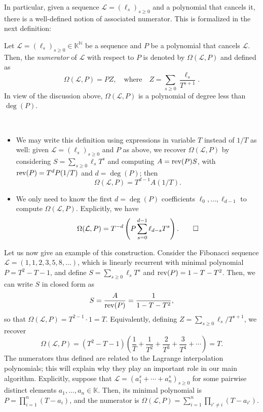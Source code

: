 \documentclass[12pt]{article}
\newcommand{\genseries}{Z}
\newcommand{\minpoly}{P}
\def\N {\ensuremath{\mathbb{N}}}
\def\K{\mathbb{K}}
\def\K {\ensuremath{\mathbb{K}}}
\begin{document}
In particular, given a sequence $\mathcal{L}=(\ell_s)_{s \ge 0}$ and a
polynomial that cancels it, there is a well-defined notion of
associated numerator.  This is formalized in the next definition:
\begin{definition}
  \label{def:omega}
  Let $\mathcal{L}=(\ell_s)_{s \ge 0}\in \K^\N$ be a sequence and $P$ be a
  polynomial that cancels $\mathcal{L}$. Then, the {\em numerator} of $\mathcal{L}$
  with respect to $P$ is denoted by $\Omega(\mathcal{L},P)$ and defined as 
  \[
    \Omega(\mathcal{L},P) = P \genseries, \quad\text{where}\quad
    \genseries=\sum_{s \ge 0} \frac {\ell_s}{T^{s+1}}.
  \]
  In view of the discussion above, $\Omega(\mathcal{L},P)$ is a polynomial of
  degree less than $\deg(P)$.
\end{definition}
\begin{remark} ~
  \begin{itemize}
  \item We may write this definition using expressions in
    variable $T$ instead of $1/T$ as well: given
    $\mathcal{L}=(\ell_s)_{s\ge0}$ and $P$ as above, we recover
    $\Omega(\mathcal{L},P)$ by considering $S=\sum_{s\ge 0} \ell_s
    T^s$ and computing $A = {\rm rev}(P) S$, with ${\rm rev}(P)=T^d
    P(1/T)$ and $d=\deg(P)$; then
    $$\Omega(\mathcal{L} ,P) = T^{d - 1} A (1/T).$$ 
\item We only need to know the first $d=\deg(P)$ coefficients
  $\ell_0,\dots,\ell_{d-1}$ to compute $\Omega(\mathcal{L}, P)$. Explicitly, we
  have
  \[
    \Omega(\mathcal{L},P) = T^{-d} \left( P \sum_{s=0}^{d-1} \ell_{d - s} T^s \right).
    \qedhere
  \]
 \end{itemize}
\end{remark}
Let us now give an example of this construction. Consider the Fibonacci sequence
$\mathcal{L} = (1,1,2,3,5,8,\dots)$, which is linearly recurrent with minimal
polynomial $P=T^2-T-1$, and define $S= \sum_{s\ge 0} \ell_{s} T^s$ and
${\rm rev}(P) = 1-T-T^2$. Then, we can write $S$ in closed form as
$$S = \frac{A}{{\rm rev}(P)} = \frac{1}{1-T-T^2},$$
so that $\Omega(\mathcal{L},P)=T^{2-1} \cdot 1=T$. Equivalently, defining
$\genseries = \sum_{s\ge0} \ell_{s}/T^{s+1}$, we recover 
\[
  \Omega(\mathcal{L},P) = (T^2-T-1)\left (\frac 1T +\frac 1{T^2} + \frac
  2{T^3} + \frac 3{T^4} + \cdots \right ) =T.
\]
The numerators thus defined are related to the Lagrange interpolation
polynomials; this will explain why they play an important role in our main
algorithm. Explicitly, suppose that $\mathcal{L} = (a_1^s + \cdots + a_n^s)_{s
\ge 0}$ for some pairwise distinct elements $a_1,\dots,a_n \in \K$. Then, its
minimal polynomial is $\minpoly=\prod_{i=1}^n (T-a_i)$, and the numerator
is $\Omega(\mathcal{L}, P) = \sum_{i=1}^n \prod_{i'\ne i} (T-a_{i'})$.
\end{document}
